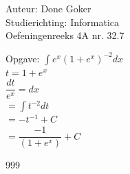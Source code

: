 \documentclass[a4paper]{article}
\begin{document}
  
\noindent \large Auteur: Done Goker \\
\noindent \large Studierichting: Informatica\\
\noindent \large Oefeningenreeks 4A nr. 32.7\\

\medskip

\normalsize

Opgave:
$\displaystyle\int e^x (1+e^x)^{-2}dx$ \\

$t = 1+ e^x$ \\

$ \dfrac{dt}{e^x}  = dx$ \\

$= \displaystyle\int t^{-2}dt $ \\

$= - t^{-1} + C$ \\

$= \dfrac{-1}{(1+e^x)} + C$

\begin{thebibliography}{999}
\end{thebibliography}
\end{document}
